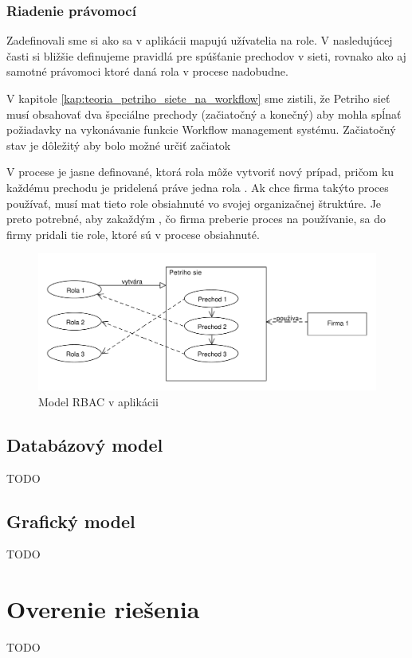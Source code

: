 	
	\subsubsection{Riadenie právomocí}	
	Zadefinovali sme si ako sa v aplikácii mapujú užívatelia na role. V nasledujúcej časti si bližšie definujeme pravidlá pre spúšťanie prechodov v sieti, rovnako ako aj samotné právomoci ktoré daná rola v procese nadobudne. 
	
	V kapitole \ref{kap:teoria_petriho_siete_na_workflow} sme zistili, že Petriho sieť musí obsahovať dva špeciálne prechody (začiatočný a konečný) aby mohla spĺnať požiadavky na vykonávanie funkcie Workflow management systému. Začiatočný stav je dôležitý aby bolo možné určiť začiatok 

	V procese je jasne definované, ktorá rola môže vytvoriť nový prípad, pričom ku každému prechodu je pridelená práve jedna rola . Ak chce firma takýto proces používať,  musí mat tieto role  obsiahnuté vo svojej organizačnej štruktúre. Je preto potrebné, aby zakaždým , čo firma preberie proces na používanie, sa do firmy pridali tie role, ktoré sú v procese obsiahnuté. 	
	
		\begin{figure}[h]
			\centering
			\includegraphics[width=0.9\linewidth]{images/roles_permissions}
			\caption{ Model RBAC v aplikácii}
			\label{fig:roles_permissions}
		\end{figure}		
	
	
	\subsection{Databázový model}
	TODO
	\subsection{Grafický model}
	TODO

\section{Overenie riešenia}
TODO
	


